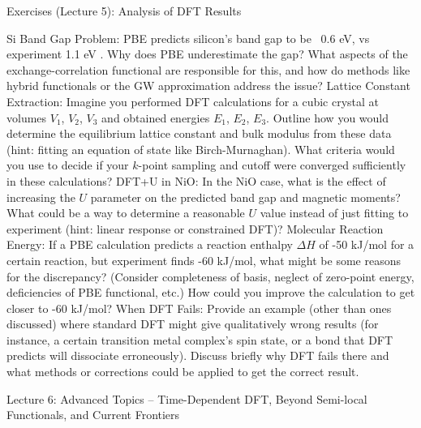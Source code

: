Exercises (Lecture 5): Analysis of DFT Results

Si Band Gap Problem: PBE predicts silicon’s band gap to be ~0.6 eV, vs experiment 1.1 eV . Why does PBE underestimate the gap? What aspects of the exchange-correlation functional are responsible for this, and how do methods like hybrid functionals or the GW approximation address the issue?
Lattice Constant Extraction: Imagine you performed DFT calculations for a cubic crystal at volumes $V_1$, $V_2$, $V_3$ and obtained energies $E_1$, $E_2$, $E_3$. Outline how you would determine the equilibrium lattice constant and bulk modulus from these data (hint: fitting an equation of state like Birch-Murnaghan). What criteria would you use to decide if your $k$-point sampling and cutoff were converged sufficiently in these calculations?
DFT+U in NiO: In the NiO case, what is the effect of increasing the $U$ parameter on the predicted band gap and magnetic moments? What could be a way to determine a reasonable $U$ value instead of just fitting to experiment (hint: linear response or constrained DFT)?
Molecular Reaction Energy: If a PBE calculation predicts a reaction enthalpy $\Delta H$ of -50 kJ/mol for a certain reaction, but experiment finds -60 kJ/mol, what might be some reasons for the discrepancy? (Consider completeness of basis, neglect of zero-point energy, deficiencies of PBE functional, etc.) How could you improve the calculation to get closer to -60 kJ/mol?
When DFT Fails: Provide an example (other than ones discussed) where standard DFT might give qualitatively wrong results (for instance, a certain transition metal complex’s spin state, or a bond that DFT predicts will dissociate erroneously). Discuss briefly why DFT fails there and what methods or corrections could be applied to get the correct result.





Lecture 6: Advanced Topics – Time-Dependent DFT, Beyond Semi-local Functionals, and Current Frontiers


